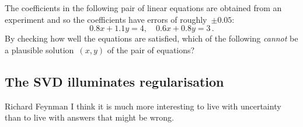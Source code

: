 \begin{activity}
The coefficients in the following pair of linear equations are obtained from an experiment and so the coefficients have errors of roughly~\(\pm0.05\):
\begin{equation*}
0.8x+1.1y=4,\quad 0.6x+0.8y=3\,.
\end{equation*}
By checking how well the equations are satisfied, which of the following \emph{cannot} be a plausible solution~\((x,y)\) of the pair of equations?
\end{activity}






\subsection{The SVD illuminates regularisation}
\label{sec:svdir}


\begin{quoted}{Richard Feynman}
I think it is much more interesting to live with uncertainty than to live with answers that might be wrong.
\end{quoted}

